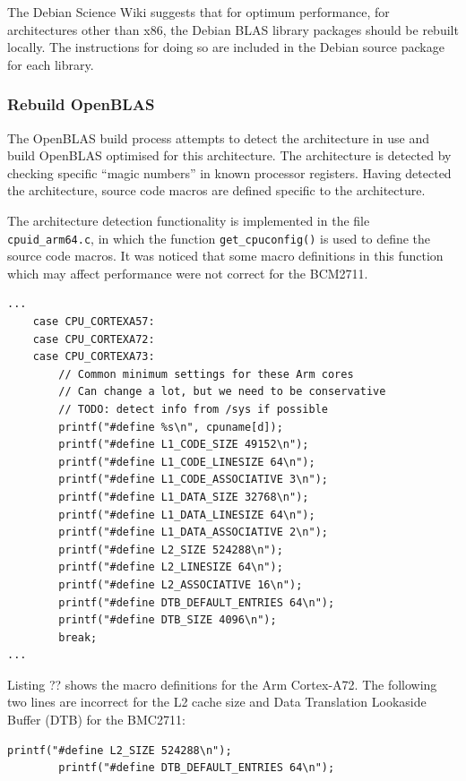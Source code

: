 \documentclass{report}
\begin{document}
The Debian Science Wiki suggests that for optimum performance, for architectures other than x86, the Debian BLAS library packages should be rebuilt locally. The instructions for doing so are included in the Debian source package for each library.


%
%
\subsubsection{Rebuild OpenBLAS}
The OpenBLAS build process attempts to detect the architecture in use and build OpenBLAS optimised for this architecture. The architecture is detected by checking specific ``magic numbers'' in known processor registers. Having detected the architecture, source code macros are defined specific to the architecture. 

The architecture detection functionality is implemented in the file \verb|cpuid_arm64.c|, in which the function \verb|get_cpuconfig()| is used to define the source code macros. It was noticed that some macro definitions in this function which may affect performance were not correct for the BCM2711.

\lstset{style=listing}
\begin{lstlisting}[caption=cpuid\_arm64.c, numbers=none]
...
	case CPU_CORTEXA57:
	case CPU_CORTEXA72:
	case CPU_CORTEXA73:
		// Common minimum settings for these Arm cores
		// Can change a lot, but we need to be conservative
		// TODO: detect info from /sys if possible
		printf("#define %s\n", cpuname[d]);
		printf("#define L1_CODE_SIZE 49152\n");
		printf("#define L1_CODE_LINESIZE 64\n");
		printf("#define L1_CODE_ASSOCIATIVE 3\n");
		printf("#define L1_DATA_SIZE 32768\n");
		printf("#define L1_DATA_LINESIZE 64\n");
		printf("#define L1_DATA_ASSOCIATIVE 2\n");
		printf("#define L2_SIZE 524288\n");
		printf("#define L2_LINESIZE 64\n");
		printf("#define L2_ASSOCIATIVE 16\n");
		printf("#define DTB_DEFAULT_ENTRIES 64\n");
		printf("#define DTB_SIZE 4096\n");
		break;
...
\end{lstlisting}

Listing ?? shows the macro definitions for the Arm Cortex-A72. The following two lines are incorrect for the L2 cache size and Data Translation Lookaside Buffer (DTB) for the BMC2711:

\lstset{style=listing}
\begin{lstlisting}[numbers=none]
		printf("#define L2_SIZE 524288\n");
		printf("#define DTB_DEFAULT_ENTRIES 64\n");
\end{lstlisting}
\end{document}
